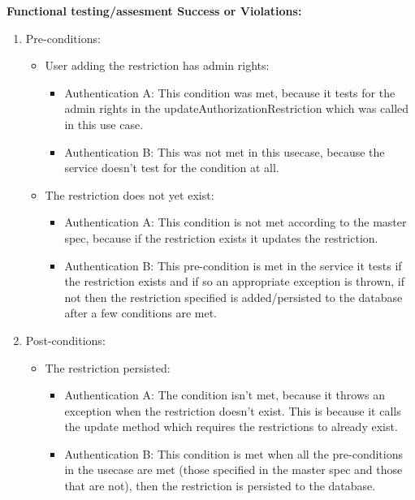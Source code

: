 \textbf{Functional testing/assesment Success or Violations:}
\begin{enumerate}
	\item Pre-conditions:
	
	\begin{itemize}
		\item User adding the restriction has admin rights:
		\begin{itemize}
				\item Authentication A: This condition was met, because it tests for the admin rights in the updateAuthorizationRestriction which was called in this use case.
				\item Authentication B: This was not met in
this usecase, because the service doesn't test for the condition at all.
		\end{itemize}
		\item The restriction does not yet exist:
		\begin{itemize}
				\item Authentication A: This condition is not met according to the master spec, because if the restriction exists it updates the restriction. 
				\item Authentication B: This pre-condition is met in the service
it tests if the restriction exists and if so an appropriate exception is thrown,
if not then the restriction specified is added/persisted to the database after a few conditions are met.
		\end{itemize}
	\end{itemize}

	\item Post-conditions:
	\begin{itemize}
		\item The restriction persisted:
			\begin{itemize}
			\item Authentication A: The condition isn't met, because it throws an exception when the restriction doesn't exist. This is because it calls the update method which requires the restrictions to already exist.
			\item Authentication B: This condition is met when all the pre-conditions in the usecase are met (those specified in the master spec and those that are not), then the restriction is persisted to the database.				
			\end{itemize}
			
	\end{itemize}
		
\end{enumerate}

